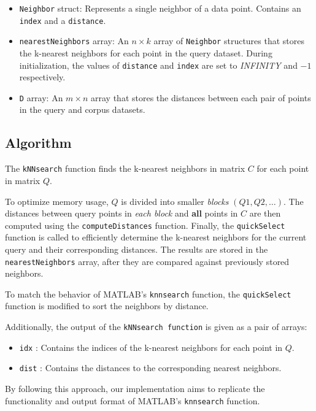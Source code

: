 \documentclass{article}
\begin{document}
\begin{itemize}
    \item \texttt{Neighbor} struct: Represents a single neighbor of a data point. Contains an \texttt{index} and a \texttt{distance}.
    \item \texttt{nearestNeighbors} array: An $n \times k$ array of \texttt{Neighbor} structures that stores the k-nearest neighbors for each point in the query dataset. During initialization, 
    the values of \texttt{distance} and \texttt{index} are set to \emph{INFINITY} and $-1$ respectively.
    \item \texttt{D} array: An $m \times n$ array that stores the distances between each pair of points in the query and corpus datasets.
\end{itemize}

\subsection{Algorithm}

The \texttt{kNNsearch} function finds the k-nearest neighbors in matrix $C$ for each point in matrix $Q$.

To optimize memory usage, $Q$ is divided into smaller \emph{blocks} $(Q1, Q2, \dots)$. 
The distances between query points in \emph{each block} and \textbf{all} points in $C$ are then computed using the \texttt{computeDistances} function.
Finally, the \texttt{quickSelect} function is called to efficiently determine the k-nearest neighbors for the current query and their corresponding distances.
The results are stored in the \texttt{nearestNeighbors} array, after they are compared against previously stored neighbors.

To match the behavior of MATLAB's \texttt{knnsearch} function, the \texttt{quickSelect} function is modified to sort the neighbors by distance.

Additionally, the output of the \texttt{kNNsearch function} is given as a pair of arrays:
\begin{itemize}
    \item \texttt{idx} : Contains the indices of the k-nearest neighbors for each point in $Q$.
    \item \texttt{dist} : Contains the distances to the corresponding nearest neighbors.
\end{itemize}

By following this approach, our implementation aims to replicate the functionality and output format of MATLAB's \texttt{knnsearch} function.
\end{document}
